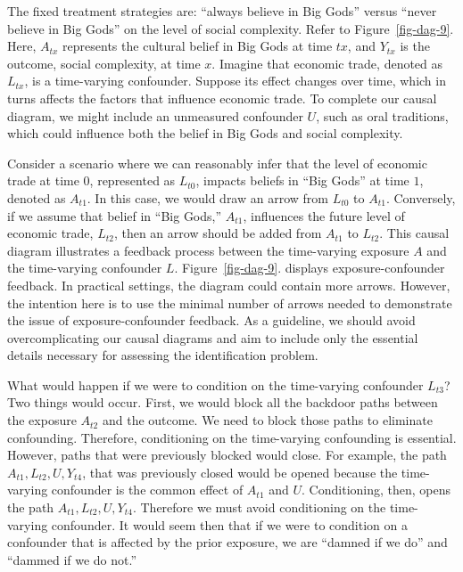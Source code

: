 \documentclass[
  singlecolumn,
  9pt]{article}
\begin{document}
The fixed treatment strategies are: ``always believe in Big Gods''
versus ``never believe in Big Gods'' on the level of social complexity.
Refer to Figure~\ref{fig-dag-9}. Here, \(A_{tx}\) represents the
cultural belief in Big Gods at time \(tx\), and \(Y_{tx}\) is the
outcome, social complexity, at time \(x\). Imagine that economic trade,
denoted as \(L_{tx}\), is a time-varying confounder. Suppose its effect
changes over time, which in turns affects the factors that influence
economic trade. To complete our causal diagram, we might include an
unmeasured confounder \(U\), such as oral traditions, which could
influence both the belief in Big Gods and social complexity.

Consider a scenario where we can reasonably infer that the level of
economic trade at time \(0\), represented as \(L_{t0}\), impacts beliefs
in ``Big Gods'' at time \(1\), denoted as \(A_{t1}\). In this case, we
would draw an arrow from \(L_{t0}\) to \(A_{t1}\). Conversely, if we
assume that belief in ``Big Gods,'' \(A_{t1}\), influences the future
level of economic trade, \(L_{t2}\), then an arrow should be added from
\(A_{t1}\) to \(L_{t2}\). This causal diagram illustrates a feedback
process between the time-varying exposure \(A\) and the time-varying
confounder \(L\). Figure~\ref{fig-dag-9}. displays exposure-confounder
feedback. In practical settings, the diagram could contain more arrows.
However, the intention here is to use the minimal number of arrows
needed to demonstrate the issue of exposure-confounder feedback. As a
guideline, we should avoid overcomplicating our causal diagrams and aim
to include only the essential details necessary for assessing the
identification problem.

What would happen if we were to condition on the time-varying confounder
\(L_{t3}\)? Two things would occur. First, we would block all the
backdoor paths between the exposure \(A_{t2}\) and the outcome. We need
to block those paths to eliminate confounding. Therefore, conditioning
on the time-varying confounding is essential. However, paths that were
previously blocked would close. For example, the path
\(A_{t1}, L_{t2}, U, Y_{t4}\), that was previously closed would be
opened because the time-varying confounder is the common effect of
\(A_{t1}\) and \(U\). Conditioning, then, opens the path
\(A_{t1}, L_{t2}, U, Y_{t4}\). Therefore we must avoid conditioning on
the time-varying confounder. It would seem then that if we were to
condition on a confounder that is affected by the prior exposure, we are
``damned if we do'' and ``dammed if we do not.''
\end{document}
